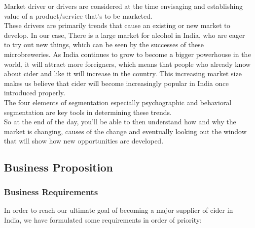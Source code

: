 \documentclass[11pt]{article}
\begin{document}
Market driver or drivers are considered at the time envisaging and establishing value of a product/service that's to be marketed. \\

These drivers are primarily trends that cause an existing or new market to develop. In our case, There is a large market for alcohol in India, who are eager to try out new things, which can be seen by the successes of these microbreweries. As India continues to grow to become a bigger powerhouse in the world, it will attract more foreigners, which means that people who already know about cider and like it will increase in the country. This increasing market size makes us believe that cider will become increasingly popular in India once introduced properly. \\

The four elements of segmentation especially psychographic and behavioral segmentation are key tools in determining these trends. \\

So at the end of the day, you'll be able to then understand how and why the market is changing, causes of the change and eventually looking out the window that will show how new opportunities are developed. \\

  \subsection{Business Proposition}

  \subsubsection{Business Requirements}

In order to reach our ultimate goal of becoming a major supplier of 
cider in India, we have formulated some requirements in order of priority: 
  
\end{document}
